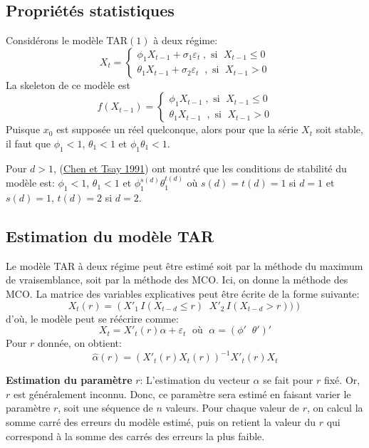 \documentclass[
  french,
]{article}
\begin{document}
\hypertarget{propriuxe9tuxe9s-statistiques}{%
\subsection{Propriétés
statistiques}\label{propriuxe9tuxe9s-statistiques}}

Considérons le modèle TAR\((1)\) à deux régime: \[
X_t=\begin{cases}
\phi_1 X_{t-1}+\sigma_1\varepsilon_t \;,\text{ si }\; X_{t-1} \leq 0\\
\theta_1 X_{t-1}+\sigma_2\varepsilon_t \;\;,\text{ si }\; X_{t-1} > 0
\end{cases}
\] La skeleton de ce modèle est \[
f(X_{t-1})=\begin{cases}
\phi_1 X_{t-1}\;,\text{ si }\; X_{t-1} \leq 0\\
\theta_1 X_{t-1}\;\;,\text{ si }\; X_{t-1} > 0
\end{cases}
\] Puisque \(x_0\) est supposée un réel quelconque, alors pour que la
série \(X_t\) soit stable, il faut que \(\phi_1 < 1\), \(\theta_1 < 1\)
et \(\phi_1 \theta_1 <1\).

Pour \(d>1\), (\protect\hyperlink{ref-chenTsay91}{Chen et Tsay 1991})
ont montré que les conditions de stabilité du modèle est: \(\phi_1 <1\),
\(\theta_1 <1\) et \(\phi_1^{s(d)}\theta_1^{t(d)}\) où \(s(d)=t(d)=1\)
si \(d=1\) et \(s(d)=1\), \(t(d)=2\) si \(d=2\).

\hypertarget{estimation-du-moduxe8le-tar}{%
\subsection{Estimation du modèle
TAR}\label{estimation-du-moduxe8le-tar}}

Le modèle TAR à deux régime peut être estimé soit par la méthode du
maximum de vraisemblance, soit par la méthode des MCO. Ici, on donne la
méthode des MCO. La matrice des variables explicatives peut être écrite
de la forme suivante: \[
X_t(r)=\left(X'_1 \,I(X_{t-d}\leq r)\;\;X'_2\,I(X_{t-d} > r)) \right)
\] d'où, le modèle peut se réécrire comme: \[
X_t=X'_t(r)\alpha+\varepsilon_t\;\text{ où }\; \alpha=(\phi'\;\;\theta')'
\] Pour \(r\) donnée, on obtient: \[
\widehat{\alpha}(r)=\left(X'_t(r)X_t(r)\right)^{-1}X'_t(r)X_t
\]

\textbf{Estimation du paramètre} \(r\): L'estimation du vecteur
\(\alpha\) se fait pour \(r\) fixé. Or, \(r\) est généralement inconnu.
Donc, ce paramètre sera estimé en faisant varier le paramètre \(r\),
soit une séquence de \(n\) valeurs. Pour chaque valeur de \(r\), on
calcul la somme carré des erreurs du modèle estimé, puis on retient la
valeur du \(r\) qui correspond à la somme des carrés des erreurs la plus
faible.
\end{document}
